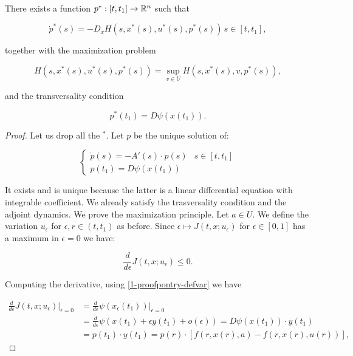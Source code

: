 \begin{theorem}\label{1-proofpontry-theo}
    There exists a function $p^{\ast}:[t,t_1]\rightarrow \mathbb{R}^n$ such that

    \begin{equation}
        \dot{p}^{\ast}(s) = -D_x H(s,x^{\ast}(s),u^{\ast}(s),p^{\ast}(s))\, s\in[t,t_1],
    \end{equation}

    together with the maximization problem

    \begin{equation}
        H(s,x^{\ast}(s),u^{\ast}(s),p^{\ast}(s)) = \sup_{v\in U} H(s,x^{\ast}(s),v,p^{\ast}(s)),
    \end{equation}

    and the transversality condition

    \begin{equation}
        p^{\ast}(t_1) = D\psi(x(t_1)).
    \end{equation}

    \begin{proof}
        Let us drop all the $^{\ast}$. Let $p$ be the unique solution of:

        \begin{equation}
            \begin{cases}
                \dot{p}(s) = - A'(s)\cdot p(s) & s\in[t,t_1] \\
                p(t_1) = D\psi(x(t_1))
            \end{cases}
        \end{equation}

        It exists and is unique because the latter is a linear differential equation with integrable coefficient. 
        We already satisfy the trasversality condition and the adjoint dynamics. We prove the 
        maximization principle. Let $a\in U$. We define the variation $u_{\epsilon}$ for $\epsilon,r\in(t,t_1)$ as before.
        Since $\epsilon\mapsto  J(t,x;u_{\epsilon})$ for $\epsilon\in[0,1]$ has a maximum in $\epsilon=0$ we have:
        
        \begin{equation*}\label{1-proofpontry-dervar0}
            \frac{d}{d\epsilon}J(t,x;u_{\epsilon})\leq0.
        \end{equation*}

        Computing the derivative, using \eqref{1-proofpontry-defvar} we have

        \begin{align*}
            \frac{d}{d\epsilon}J(t,x;u_{\epsilon})\big|_{\epsilon=0} & = \frac{d}{d\epsilon}\psi(x_{\epsilon}(t_1))\big|_{\epsilon=0} \\
            & = \frac{d}{d\epsilon}\psi(x(t_1) + \epsilon y(t_1) + o(\epsilon)) = D\psi(x(t_1))\cdot y(t_1) \\
            & = p(t_1)\cdot y(t_1) = p(r)\cdot[f(r,x(r),a)-f(r,x(r),u(r))],
        \end{align*}


\end{proof}
\end{theorem}
